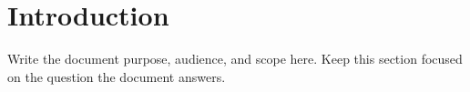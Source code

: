 \section{Introduction}

Write the document purpose, audience, and scope here. Keep this section focused on the question the document answers.
